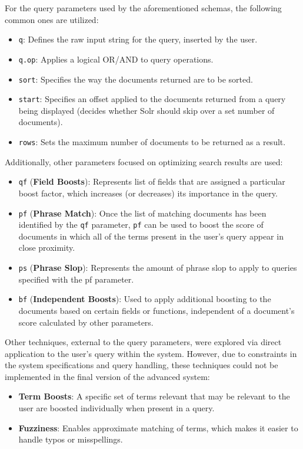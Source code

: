 \documentclass[sigconf]{acmart}
\begin{document}
For the query parameters used by the aforementioned schemas, the following common ones are utilized:
\begin{itemize}
    \item \texttt{q}: Defines the raw input string for the query, inserted by the user.
    \item \texttt{q.op}: Applies a logical OR/AND to query operations.
    \item \texttt{sort}: Specifies the way the documents returned are to be sorted.
    \item \texttt{start}: Specifies an offset applied to the documents returned from a query being displayed (decides whether Solr should skip over a set number of documents).
    \item \texttt{rows}: Sets the maximum number of documents to be returned as a result.
\end{itemize}

Additionally, other parameters focused on optimizing search results are used:
\begin{itemize}
    \item \texttt{qf} (\textbf{Field Boosts}): Represents list of fields that are assigned a particular boost factor, which increases (or decreases) its importance in the query.
    \item \texttt{pf} (\textbf{Phrase Match}): Once the list of matching documents has been identified by the \texttt{qf} parameter, \texttt{pf} can be used to boost the score of documents in which all of the terms present in the user's query appear in close proximity.
    \item \texttt{ps} (\textbf{Phrase Slop}): Represents the amount of phrase slop\cite{slop} to apply to queries specified with the pf parameter.
    \item \texttt{bf} (\textbf{Independent Boosts}): Used to apply additional boosting to the documents based on certain fields or functions, independent of a document's score calculated by other parameters.
\end{itemize}

Other techniques, external to the query parameters, were explored via direct application to the user's query within the system. However, due to constraints in the system specifications and query handling, these techniques could not be implemented in the final version of the advanced system:
\begin{itemize}
    \item \textbf{Term Boosts}: A specific set of terms relevant that may be relevant to the user are boosted individually when present in a query.
    \item \textbf{Fuzziness}: Enables approximate matching of terms, which makes it easier to handle typos or misspellings.
\end{itemize}
\end{document}
